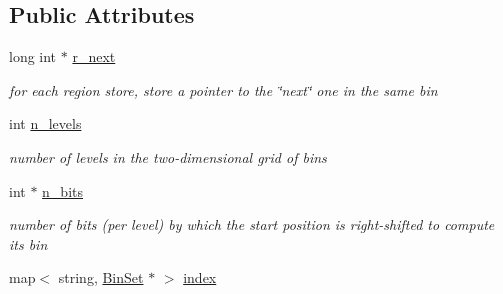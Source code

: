 \subsection*{Public Attributes}
\begin{CompactItemize}
\item 
\hypertarget{classUnsortedGenomicRegionSetOverlaps_251e09b7f0a13a56b902c30791228ce4}{
long int $\ast$ \hyperlink{classUnsortedGenomicRegionSetOverlaps_251e09b7f0a13a56b902c30791228ce4}{r\_\-next}}
\label{classUnsortedGenomicRegionSetOverlaps_251e09b7f0a13a56b902c30791228ce4}

\begin{CompactList}\small\item\em for each region store, store a pointer to the \char`\"{}next\char`\"{} one in the same bin \item\end{CompactList}\item 
\hypertarget{classUnsortedGenomicRegionSetOverlaps_1cc721de471ed40dcc7d8eae258e5833}{
int \hyperlink{classUnsortedGenomicRegionSetOverlaps_1cc721de471ed40dcc7d8eae258e5833}{n\_\-levels}}
\label{classUnsortedGenomicRegionSetOverlaps_1cc721de471ed40dcc7d8eae258e5833}

\begin{CompactList}\small\item\em number of levels in the two-dimensional grid of bins \item\end{CompactList}\item 
\hypertarget{classUnsortedGenomicRegionSetOverlaps_76ecebfcf839a940bdae26069ceef748}{
int $\ast$ \hyperlink{classUnsortedGenomicRegionSetOverlaps_76ecebfcf839a940bdae26069ceef748}{n\_\-bits}}
\label{classUnsortedGenomicRegionSetOverlaps_76ecebfcf839a940bdae26069ceef748}

\begin{CompactList}\small\item\em number of bits (per level) by which the start position is right-shifted to compute its bin \item\end{CompactList}\item 
\hypertarget{classUnsortedGenomicRegionSetOverlaps_beeb94562abdf4aebc36684959a5bc78}{
map$<$ string, \hyperlink{classUnsortedGenomicRegionSetOverlaps_0f0857dd93ad3c047d1f5056a57edc14}{BinSet} $\ast$ $>$ \hyperlink{classUnsortedGenomicRegionSetOverlaps_beeb94562abdf4aebc36684959a5bc78}{index}}
\label{classUnsortedGenomicRegionSetOverlaps_beeb94562abdf4aebc36684959a5bc78}


\end{CompactItemize}
